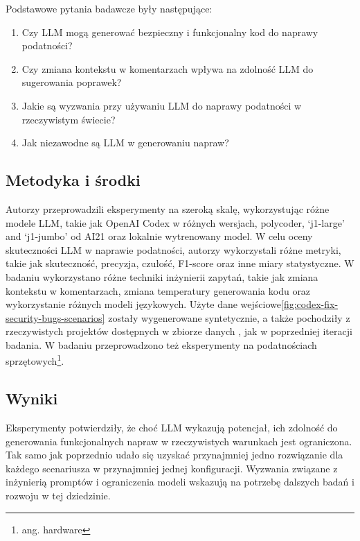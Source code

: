 Podstawowe pytania badawcze były następujące:
\begin{enumerate}
    \item Czy LLM mogą generować bezpieczny i funkcjonalny kod do naprawy podatności?
    \item Czy zmiana kontekstu w komentarzach wpływa na zdolność LLM do sugerowania poprawek?
    \item Jakie są wyzwania przy używaniu LLM do naprawy podatności w rzeczywistym świecie?
    \item Jak niezawodne są LLM w generowaniu napraw?
\end{enumerate}

\subsection{Metodyka i środki}
Autorzy przeprowadzili eksperymenty na szeroką skalę, wykorzystując różne modele LLM, takie jak OpenAI Codex w różnych wersjach, polycoder, ‘j1-large’ and ‘j1-jumbo’ od AI21 oraz lokalnie wytrenowany model. W celu oceny skuteczności LLM w naprawie podatności, autorzy wykorzystali różne metryki, takie jak skuteczność, precyzja, czułość, F1-score oraz inne miary statystyczne. W badaniu wykorzystano różne techniki inżynierii zapytań, takie jak zmiana kontekstu w komentarzach, zmiana temperatury generowania kodu oraz wykorzystanie różnych modeli językowych. Użyte dane wejściowe\ref{fig:codex-fix-security-bugs-scenarios} zostały wygenerowane syntetycznie, a także pochodziły z rzeczywistych projektów dostępnych w zbiorze danych , jak w poprzedniej iteracji badania. W badaniu przeprowadzono też eksperymenty na podatnościach sprzętowych\footnote{ang. hardware}.

\subsection{Wyniki}
Eksperymenty potwierdziły, że choć LLM wykazują potencjał, ich zdolność do generowania funkcjonalnych napraw w rzeczywistych warunkach jest ograniczona. Tak samo jak poprzednio udało się uzyskać przynajmniej jedno rozwiązanie dla każdego scenariusza w przynajmniej jednej konfiguracji. Wyzwania związane z inżynierią promptów i ograniczenia modeli wskazują na potrzebę dalszych badań i rozwoju w tej dziedzinie.

